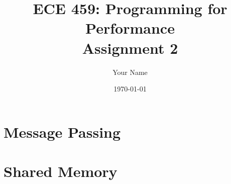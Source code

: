 \documentclass[12pt]{article}
\title{ECE 459: Programming for Performance\\Assignment 2}
\author{Your Name}
\date{\today}
\begin{document}
\maketitle

\section{Message Passing}


\section{Shared Memory}
\end{document}
